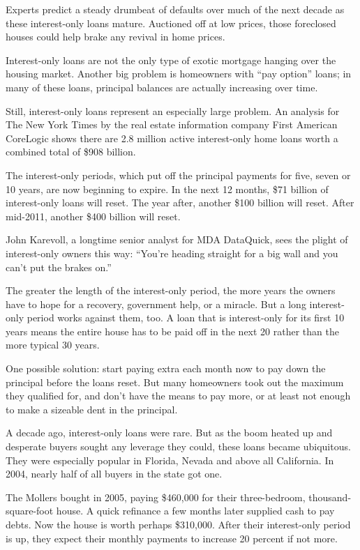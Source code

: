 ﻿\documentclass[12pt]{article}
\begin{document}
Experts predict a steady drumbeat of defaults over much of the next decade as these interest-only
loans mature. Auctioned off at low prices, those foreclosed houses could help brake any revival in
home prices.

Interest-only loans are not the only type of exotic mortgage hanging over the housing market.
Another big problem is homeowners with ``pay option'' loans; in many of these loans, principal
balances are actually increasing over time.

Still, interest-only loans represent an especially large problem. An analysis for The New York Times
by the real estate information company First American CoreLogic shows there are 2.8 million active
interest-only home loans worth a combined total of \$908 billion.

The interest-only periods, which put off the principal payments for five, seven or 10 years, are now
beginning to expire. In the next 12 months, \$71 billion of interest-only loans will reset. The year
after, another \$100 billion will reset. After mid-2011, another \$400 billion will reset.

John Karevoll, a longtime senior analyst for MDA DataQuick, sees the plight of interest-only owners
this way: ``You're heading straight for a big wall and you can't put the brakes on.''

The greater the length of the interest-only period, the more years the owners have to hope for a
recovery, government help, or a miracle. But a long interest-only period works against them, too. A
loan that is interest-only for its first 10 years means the entire house has to be paid off in the
next 20 rather than the more typical 30 years.

One possible solution: start paying extra each month now to pay down the principal before the loans
reset. But many homeowners took out the maximum they qualified for, and don't have the means to pay
more, or at least not enough to make a sizeable dent in the principal.

A decade ago, interest-only loans were rare. But as the boom heated up and desperate buyers sought
any leverage they could, these loans became ubiquitous. They were especially popular in Florida,
Nevada and above all California. In 2004, nearly half of all buyers in the state got one.

The Mollers bought in 2005, paying \$460,000 for their three-bedroom, thousand-square-foot house. A
quick refinance a few months later supplied cash to pay debts. Now the house is worth perhaps
\$310,000. After their interest-only period is up, they expect their monthly payments to increase 20
percent if not more.
\end{document}
